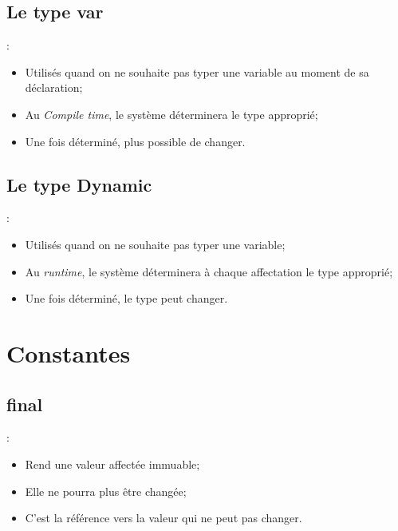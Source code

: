 \documentclass[10pt]{beamer}
\begin{document}
\subsection{Le type var}
\begin{frame}[fragile,t]{\secname : \subsecname}
    \begin{itemize}
        \item Utilisés quand on ne souhaite pas typer une variable au moment de sa déclaration;
        \item Au \textit{Compile time}, le système déterminera le type approprié;
        \item Une fois déterminé, plus possible de changer.
    \end{itemize}
    
\end{frame}

\subsection{Le type Dynamic}
\begin{frame}[fragile,t]{\secname : \subsecname}
    \begin{itemize}
        \item Utilisés quand on ne souhaite pas typer une variable;
        \item Au \textit{runtime}, le système déterminera à chaque affectation le type approprié;
        \item Une fois déterminé, le type peut changer.
    \end{itemize}
    
\end{frame}

\section{Constantes}
\subsection{final}
\begin{frame}[fragile,t]{\secname : \subsecname}
    \begin{itemize}
        \item Rend une valeur affectée immuable;
        \item Elle ne pourra plus être changée;
        \item C'est la référence vers la valeur qui ne peut pas changer.
    \end{itemize}
    
\end{frame}
\end{document}
